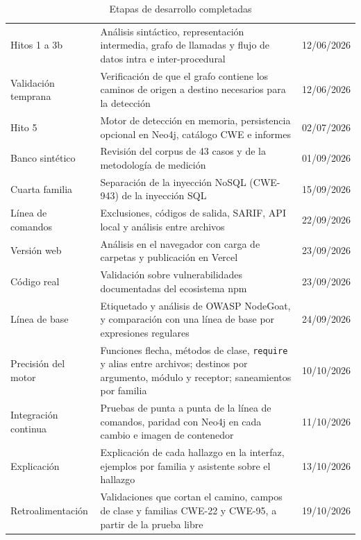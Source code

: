 \begin{table}[H]
    \centering
    \caption{Etapas de desarrollo completadas}
    \label{tab:hitos-reales}
    \small
    \begin{tabularx}{\textwidth}{l L l}
        \toprule
         &  &  \\
        \midrule
        Hitos 1 a 3b & Análisis sintáctico, representación intermedia, grafo de llamadas y flujo de datos intra e inter-procedural & 12/06/2026 \\
        Validación temprana & Verificación de que el grafo contiene los caminos de origen a destino necesarios para la detección & 12/06/2026 \\
        Hito 5 & Motor de detección en memoria, persistencia opcional en Neo4j, catálogo CWE e informes & 02/07/2026 \\
        Banco sintético & Revisión del corpus de 43 casos y de la metodología de medición & 01/09/2026 \\
        Cuarta familia & Separación de la inyección NoSQL (CWE-943) de la inyección SQL & 15/09/2026 \\
        Línea de comandos & Exclusiones, códigos de salida, SARIF, API local y análisis entre archivos & 22/09/2026 \\
        Versión web & Análisis en el navegador con carga de carpetas y publicación en Vercel & 23/09/2026 \\
        Código real & Validación sobre vulnerabilidades documentadas del ecosistema npm & 23/09/2026 \\
        Línea de base & Etiquetado y análisis de OWASP NodeGoat, y comparación con una línea de base por expresiones regulares & 24/09/2026 \\
        Precisión del motor & Funciones flecha, métodos de clase, \texttt{require} y alias entre archivos; destinos por argumento, módulo y receptor; saneamientos por familia & 10/10/2026 \\
        Integración continua & Pruebas de punta a punta de la línea de comandos, paridad con Neo4j en cada cambio e imagen de contenedor & 11/10/2026 \\
        Explicación & Explicación de cada hallazgo en la interfaz, ejemplos por familia y asistente sobre el hallazgo & 13/10/2026 \\
        Retroalimentación & Validaciones que cortan el camino, campos de clase y familias CWE-22 y CWE-95, a partir de la prueba libre & 19/10/2026 \\

\end{tabularx}
\end{table}

